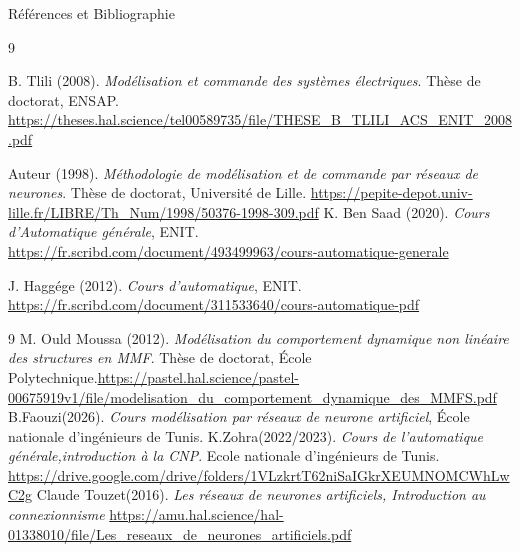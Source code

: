\documentclass[aspectratio=169,12pt]{beamer}
\begin{document}
	
	\begin{frame}{\color {red}Références et Bibliographie}
		\begin{thebibliography}{9}
			
			B. Tlili (2008).
			\textit{Modélisation et commande des systèmes électriques}.
			Thèse de doctorat, ENSAP.
			\url{https://theses.hal.science/tel00589735/file/THESE_B_TLILI_ACS_ENIT_2008.pdf}
			
			Auteur (1998).
			\textit{Méthodologie de modélisation et de commande par réseaux de neurones}.
			Thèse de doctorat, Université de Lille.
			\url{https://pepite-depot.univ-lille.fr/LIBRE/Th_Num/1998/50376-1998-309.pdf}
			K. Ben Saad (2020).
			\textit{Cours d'Automatique générale}, ENIT.
			\url{https://fr.scribd.com/document/493499963/cours-automatique-generale}
			
			J. Haggége (2012).
			\textit{Cours d'automatique}, ENIT.
			\url{https://fr.scribd.com/document/311533640/cours-automatique-pdf}
		\end{thebibliography}
	\end{frame}
	
	
	
	\begin{frame}{ }
		\begin{thebibliography}{9}
			\bibitem{ref6}
			M. Ould Moussa (2012).
			\textit{Modélisation du comportement dynamique non linéaire des structures en MMF}.
			Thèse de doctorat, École Polytechnique.\url{https://pastel.hal.science/pastel-00675919v1/file/modelisation_du_comportement_dynamique_des_MMFS.pdf}
			\bibitem{ref7}
			B.Faouzi(2026).
			\textit{Cours modélisation par réseaux de neurone artificiel},
			École nationale d'ingénieurs de Tunis.
			\bibitem{ref8}
			K.Zohra(2022/2023).
			\textit{Cours de l'automatique générale,introduction à la CNP}.
			Ecole nationale d'ingénieurs de Tunis.
			\url{https://drive.google.com/drive/folders/1VLzkrtT62niSaIGkrXEUMNOMCWhLwC2g}
			\bibitem{ref9}
			Claude Touzet(2016).
			\textit{Les réseaux de neurones artificiels, Introduction au connexionnisme}
			\url{https://amu.hal.science/hal-01338010/file/Les_reseaux_de_neurones_artificiels.pdf}
		\end{thebibliography}
	\end{frame}
	
	
	
\end{document}
